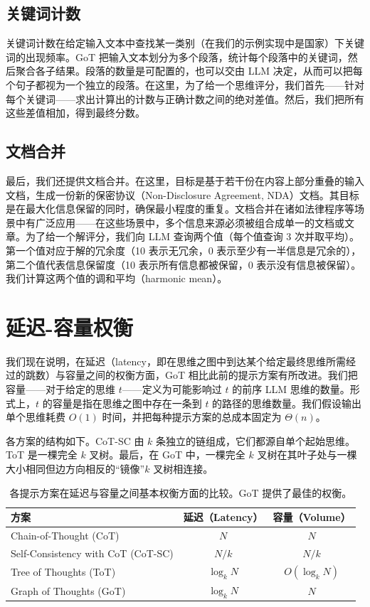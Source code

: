\documentclass[11pt,UTF8,fontset=fandol]{ctexart}
\begin{document}
\subsection{关键词计数}

关键词计数在给定输入文本中查找某一类别（在我们的示例实现中是国家）下关键词的出现频率。GoT 把输入文本划分为多个段落，统计每个段落中的关键词，然后聚合各子结果。段落的数量是可配置的，也可以交由 LLM 决定，从而可以把每个句子都视为一个独立的段落。在这里，为了给一个思维评分，我们首先——针对每个关键词——求出计算出的计数与正确计数之间的绝对差值。然后，我们把所有这些差值相加，得到最终分数。

\subsection{文档合并}

最后，我们还提供文档合并。在这里，目标是基于若干份在内容上部分重叠的输入文档，生成一份新的保密协议（Non-Disclosure Agreement, NDA）文档。其目标是在最大化信息保留的同时，确保最小程度的重复。文档合并在诸如法律程序等场景中有广泛应用——在这些场景中，多个信息来源必须被组合成单一的文档或文章。为了给一个解评分，我们向 LLM 查询两个值（每个值查询 3 次并取平均）。第一个值对应于解的冗余度（10 表示无冗余，0 表示至少有一半信息是冗余的），第二个值代表信息保留度（10 表示所有信息都被保留，0 表示没有信息被保留）。我们计算这两个值的调和平均（harmonic mean）。

\section{延迟-容量权衡}

我们现在说明，在延迟（latency，即在思维之图中到达某个给定最终思维所需经过的跳数）与容量之间的权衡方面，GoT 相比此前的提示方案有所改进。我们把容量——对于给定的思维 $t$——定义为可能影响过 $t$ 的前序 LLM 思维的数量。形式上，$t$ 的容量是指在思维之图中存在一条到 $t$ 的路径的思维数量。我们假设输出单个思维耗费 $O(1)$ 时间，并把每种提示方案的总成本固定为 $\Theta(n)$。

各方案的结构如下。CoT-SC 由 $k$ 条独立的链组成，它们都源自单个起始思维。ToT 是一棵完全 $k$ 叉树。最后，在 GoT 中，一棵完全 $k$ 叉树在其叶子处与一棵大小相同但边方向相反的“镜像”$k$ 叉树相连接。

\begin{table}[H]\centering
\caption{各提示方案在延迟与容量之间基本权衡方面的比较。GoT 提供了最佳的权衡。}
\label{tab:2}
\begin{tabular}{lcc}
\toprule
方案 & 延迟（Latency） & 容量（Volume） \\
\midrule
Chain-of-Thought (CoT)             & $N$        & $N$ \\
Self-Consistency with CoT (CoT-SC) & $N/k$      & $N/k$ \\
Tree of Thoughts (ToT)             & $\log_k N$ & $O(\log_k N)$ \\
Graph of Thoughts (GoT)            & $\log_k N$ & $N$ \\
\bottomrule
\end{tabular}
\end{table}
\end{document}
